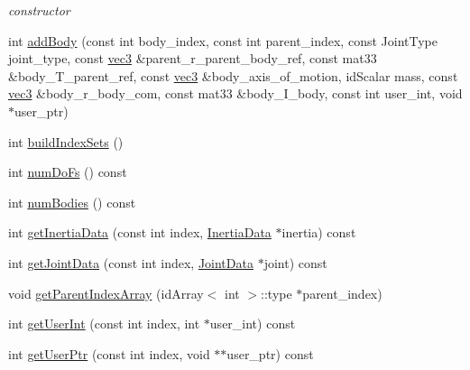 \begin{CompactItemize}
\begin{CompactList}\small\item\em constructor \item\end{CompactList}\item 
int \hyperlink{classbt_inverse_dynamics_1_1_multi_body_tree_1_1_init_cache_3140b788b6cdc6c5a74cf2da2e8f5fac}{addBody} (const int body\_\-index, const int parent\_\-index, const JointType joint\_\-type, const \hyperlink{classbt_inverse_dynamics_1_1vec3}{vec3} \&parent\_\-r\_\-parent\_\-body\_\-ref, const mat33 \&body\_\-T\_\-parent\_\-ref, const \hyperlink{classbt_inverse_dynamics_1_1vec3}{vec3} \&body\_\-axis\_\-of\_\-motion, idScalar mass, const \hyperlink{classbt_inverse_dynamics_1_1vec3}{vec3} \&body\_\-r\_\-body\_\-com, const mat33 \&body\_\-I\_\-body, const int user\_\-int, void $\ast$user\_\-ptr)
\item 
int \hyperlink{classbt_inverse_dynamics_1_1_multi_body_tree_1_1_init_cache_41e961d85dcd9e9f9aa9b18ac33289c9}{buildIndexSets} ()
\item 
int \hyperlink{classbt_inverse_dynamics_1_1_multi_body_tree_1_1_init_cache_38d366cfeb082b06f72eff27befae30b}{numDoFs} () const 
\item 
int \hyperlink{classbt_inverse_dynamics_1_1_multi_body_tree_1_1_init_cache_6203870a6e9093f6c26280feaee27832}{numBodies} () const 
\item 
int \hyperlink{classbt_inverse_dynamics_1_1_multi_body_tree_1_1_init_cache_ee00442cb04aaf00db41cac11b046567}{getInertiaData} (const int index, \hyperlink{structbt_inverse_dynamics_1_1_inertia_data}{InertiaData} $\ast$inertia) const 
\item 
int \hyperlink{classbt_inverse_dynamics_1_1_multi_body_tree_1_1_init_cache_b877d886f33dd223c33d6629d7531b2d}{getJointData} (const int index, \hyperlink{structbt_inverse_dynamics_1_1_joint_data}{JointData} $\ast$joint) const 
\item 
void \hyperlink{classbt_inverse_dynamics_1_1_multi_body_tree_1_1_init_cache_e176197bd93ec8b395b9f9c0b538458c}{getParentIndexArray} (idArray$<$ int $>$::type $\ast$parent\_\-index)
\item 
int \hyperlink{classbt_inverse_dynamics_1_1_multi_body_tree_1_1_init_cache_88ec979065d527a5ee6759e8dfb8a768}{getUserInt} (const int index, int $\ast$user\_\-int) const 
\item 
int \hyperlink{classbt_inverse_dynamics_1_1_multi_body_tree_1_1_init_cache_d5bbbbb03bdeeca34fe740f45c86274b}{getUserPtr} (const int index, void $\ast$$\ast$user\_\-ptr) const 
\end{CompactItemize}


